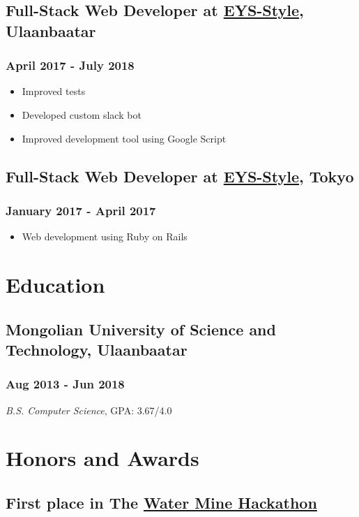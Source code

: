 \documentclass[letterpaper]{article}
\begin{document}
\subsection{Full-Stack Web Developer at \href{http:www.eys-style.com}{EYS-Style}, Ulaanbaatar}
\label{sec:orgeabc8c2}
\subsubsection{April 2017 - July 2018}
\label{sec:org35ea6c9}
\begin{itemize}
\item Improved tests
\item Developed custom slack bot
\item Improved development tool using Google Script
\end{itemize}
\subsection{Full-Stack Web Developer at \href{http:www.eys-style.com}{EYS-Style}, Tokyo}
\label{sec:org4d6e3d0}
\subsubsection{January 2017 - April 2017}
\label{sec:orgcec1638}
\begin{itemize}
\item Web development using Ruby on Rails
\end{itemize}
\section{Education}
\label{sec:org23a5ecd}
\subsection{Mongolian University of Science and Technology, Ulaanbaatar}
\label{sec:orga2eb7f1}
\subsubsection{Aug 2013 - Jun 2018}
\label{sec:orgd782942}
\emph{B.S. Computer Science}, GPA: 3.67/4.0
\section{Honors and Awards}
\label{sec:org31f44a3}
\subsection{First place in The \href{https://www.unread.today/c/2191}{Water Mine Hackathon}}
\label{sec:org1a6d310}
\end{document}

